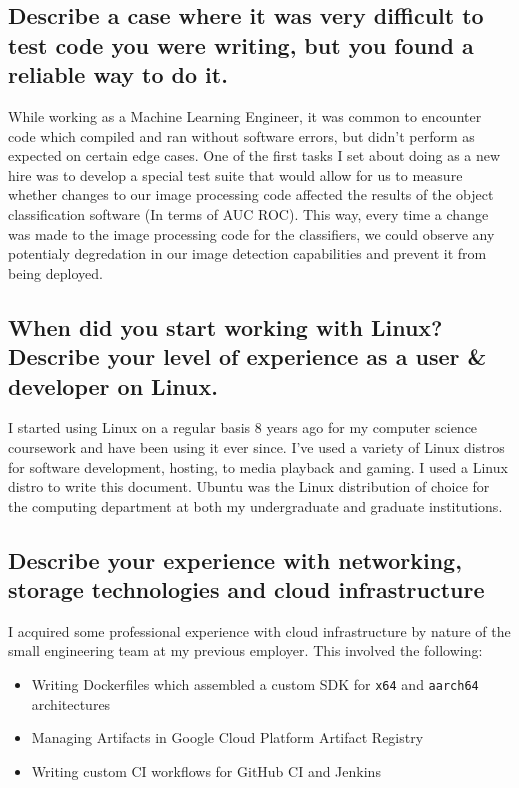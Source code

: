 \documentclass{article}
\begin{document}
\subsection{Describe a case where it was very difficult to test code you were
    writing, but you found a reliable way to do it.}

While working as a Machine Learning Engineer, it was common to encounter
code which compiled and ran without software errors, but didn't perform as
expected on certain edge cases. One of the first tasks I set about doing as a
new hire was to develop a special test suite that would allow for us to measure
whether changes to our image processing code affected the results of the object
classification software (In terms of AUC ROC\cite{auc_roc}). This way, every
time a change was made to the image processing code for the classifiers, we could
observe any potentialy degredation in our image detection capabilities and prevent
it from being deployed.

\subsection{When did you start working with Linux? Describe your level of
    experience as a user \& developer on Linux.}

I started using Linux on a regular basis 8 years ago for my computer science
coursework and have been using it ever since. I've used a variety of Linux
distros for software development, hosting, to media playback and gaming. I
used a Linux distro to write this document. Ubuntu was the Linux distribution of
choice for the computing department at both my undergraduate and graduate institutions.

\subsection{Describe your experience with networking, storage technologies and
    cloud infrastructure}

I acquired some professional experience with cloud infrastructure by nature of the
small engineering team at my previous employer. This involved the following:
\begin{itemize}
    \item Writing Dockerfiles which assembled a custom SDK for \texttt{x64} and \texttt{aarch64} architectures
    \item Managing Artifacts in Google Cloud Platform Artifact Registry
    \item Writing custom CI workflows for GitHub CI and Jenkins
\end{itemize}
\end{document}
